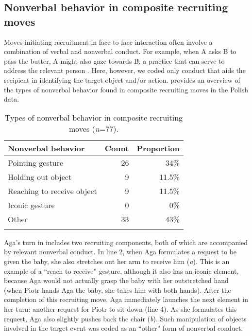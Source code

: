 \documentclass[output=paper]{langsci/langscibook}
\begin{document}
\subsection{Nonverbal behavior in composite recruiting moves}

Moves initiating recruitment in face-to-face interaction often involve a combination of verbal and nonverbal conduct.  For example, when A asks B to pass the butter, A might also gaze towards B, a practice that can serve to address the relevant person \citep{Lerner2003}.  Here, however, we coded only conduct that aids the recipient in identifying the target object and/or action.  provides an overview of the types of nonverbal behavior found in composite recruiting moves in the Polish data.

\begin{table}
\begin{tabularx}{0.75\textwidth}{Xrr}
\lsptoprule
Nonverbal behavior & Count & Proportion \\
\midrule
Pointing gesture & 26 & 34\%\\
Holding out object & 9 & 11.5\%\\
Reaching to receive object & 9 & 11.5\%\\
Iconic gesture & 0 & 0\%\\
Other & 33 & 43\%\\
\lspbottomrule
\end{tabularx}
\caption{Types of nonverbal behavior in composite recruiting moves (\textit{n}=77).}
\label{tab:zinken:1}
\end{table}

Aga’s turn in  includes two recruiting components, both of which are accompanied by relevant nonverbal conduct.  In line 2, when Aga formulates a request to be given the baby, she also stretches out her arm to receive him (\textit{a}).  This is an example of a “reach to receive” gesture, although it also has an iconic element, because Aga would not actually grasp the baby with her outstretched hand (when Piotr hands Aga the baby, she takes him with both hands).  After the completion of this recruiting move, Aga immediately launches the next element in her turn: another request for Piotr to sit down (line 4). As she formulates this request, Aga also slightly pushes back the chair (\textit{b}).  Such manipulation of objects involved in the target event was coded as an “other” form of nonverbal conduct.
\end{document}
